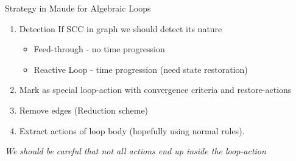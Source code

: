 \documentclass{beamer}
\begin{document}
\begin{frame}{Strategy in Maude for Algebraic Loops}
    \begin{enumerate}
        \item Detection If SCC in graph we should detect its nature
        \begin{itemize}
            \item Feed-through - no time progression
            \item Reactive Loop - time progression (need state restoration)
        \end{itemize}
        \item Mark as special loop-action with convergence criteria and restore-actions
        \item Remove edges (Reduction scheme) 
        \item Extract actions of loop body (hopefully using normal rules).
    \end{enumerate}  
    \emph{We should be careful that not all actions end up inside the loop-action}
\end{frame}
\end{document}
